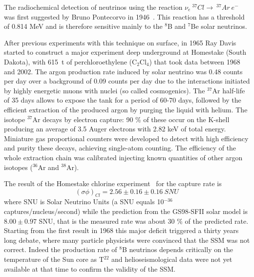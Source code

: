 The radiochemical detection of neutrinos using the reaction 
$\nu_e~^{37}Cl\rightarrow~^{37}Ar~e^-$ was first suggested by Bruno Pontecorvo in 1946~\cite{pontecorvo46}. This reaction has a threshold of 0.814 MeV and is therefore sensitive mainly to the $^8$B and $^7$Be solar neutrinos.

After previous experiments with this technique on surface, in 1965 Ray  Davis started  to construct a major experiment deep underground at Homestake (South Dakota), with 615~t of perchloroethylene (C$_2$Cl$_4$) that took data between 1968 and 2002.
The argon production rate induced by solar neutrino was 0.48 counts per day over a background of 0.09 counts per day due to the interactions initiated by highly energetic muons with nuclei (so called cosmogenics).
The $^{37}$Ar half-life of 35 days allows to expose the tank for a period of 60-70 days, followed by the efficient extraction of the produced argon by purging the liquid with helium.  
The isotope $^{37}$Ar decays by electron capture: 90 \% of these occur on the K-shell producing an average of 3.5 Auger electrons with 2.82 keV of total energy. Miniature gas proportional counters were developed to detect with high efficiency and purity these decays, achieving single-atom counting.
The efficiency of the whole extraction chain was calibrated injecting known quantities of other argon isotopes ($^{36}$Ar and $^{38}$Ar).  

The result of the Homestake chlorine experiment~\cite{cleveland} for the capture rate  is
\begin{equation}
(\sigma \phi)_{Cl} = 2.56 \pm 0.16 \pm 0.16 \: SNU
\end{equation}
where SNU is Solar Neutrino Units (a SNU equals 10$^{-36}$ captures/nucleus/second) while the prediction from the GS98-SFII solar model is $8.00 \pm 0.97$ SNU, that is the measured rate was about 30 \% of the predicted rate.  
Starting from the first result in 1968 this major deficit triggered a thirty years long debate, where many particle physicists were convinced that the SSM was not correct. Indeed the production rate of $ {^8}$B neutrinos depends critically on the temperature of the Sun core as T$^{22}$ and helioseismological data were not yet available at that time to confirm the validity of the SSM. 

